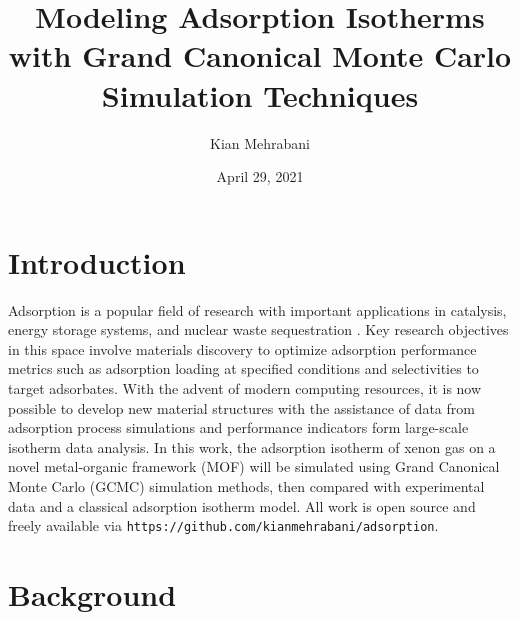 \documentclass{article}
\author{Kian Mehrabani}
\date{April 29, 2021}
\title{Modeling Adsorption Isotherms with Grand Canonical Monte Carlo Simulation Techniques}
\begin{document}
\maketitle\newpage
\doublespacing

\section{Introduction}
Adsorption is a popular field of research with important applications in catalysis, energy storage systems, and nuclear waste sequestration \cite{h2-storage, sbmof-discovery}.
Key research objectives in this space involve materials discovery to optimize adsorption performance metrics such as adsorption loading at specified conditions and selectivities to target adsorbates.
With the advent of modern computing resources, it is now possible to develop new material structures with the assistance of data from adsorption process simulations and performance indicators form large-scale isotherm data analysis.
In this work, the adsorption isotherm of xenon gas on a novel metal-organic framework (MOF) will be simulated using Grand Canonical Monte Carlo (GCMC) simulation methods, then compared with experimental data and a classical adsorption isotherm model. All work is open source and freely available via \texttt{https://github.com/kianmehrabani/adsorption}.

\section{Background}
\end{document}
